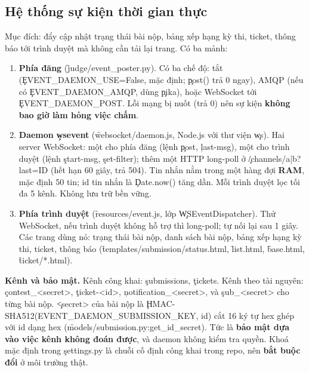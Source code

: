 \subsection{Hệ thống sự kiện thời gian thực}\label{sec:events}
Mục đích: đẩy cập nhật trạng thái bài nộp, bảng xếp hạng kỳ thi, ticket, thông báo tới trình duyệt mà không cần tải lại trang. Có ba mảnh:
\begin{enumerate}
\item \textbf{Phía đăng} (\f{judge/event_poster.py}). Có ba chế độ: tắt (\c{EVENT_DAEMON_USE=False}, mặc định; \c{post()} trả 0 ngay), AMQP (nếu có \c{EVENT_DAEMON_AMQP}, dùng \c{pika}), hoặc WebSocket tới \c{EVENT_DAEMON_POST}. Lỗi mạng bị nuốt (trả 0) nên sự kiện \textbf{không bao giờ làm hỏng việc chấm}. \tS
\item \textbf{Daemon \c{wsevent}} (\f{websocket/daemon.js}, Node.js với thư viện \c{ws}). Hai server WebSocket: một cho phía đăng (lệnh \c{post}, \c{last-msg}), một cho trình duyệt (lệnh \c{start-msg}, \c{set-filter}); thêm một HTTP long-poll ở \c{/channels/a|b?last=ID} (hết hạn 60 giây, trả 504). Tin nhắn nằm trong một hàng đợi \textbf{RAM}, mặc định 50 tin; id tin nhắn là \c{Date.now()} tăng dần. Mỗi trình duyệt lọc tối đa 5 kênh. Không lưu trữ bền vững. \tS
\item \textbf{Phía trình duyệt} (\f{resources/event.js}, lớp \c{WSEventDispatcher}). Thử WebSocket, nếu trình duyệt không hỗ trợ thì long-poll; tự nối lại sau 1 giây. Các trang dùng nó: trạng thái bài nộp, danh sách bài nộp, bảng xếp hạng kỳ thi, ticket, thông báo (\f{templates/submission/status.html}, \f{list.html}, \f{base.html}, \f{ticket/*.html}). \tS
\end{enumerate}
\textbf{Kênh và bảo mật.} Kênh công khai: \c{submissions}, \c{tickets}. Kênh theo tài nguyên: \c{contest_<secret>}, \c{ticket-<id>}, \c{notification_<secret>}, và \c{sub_<secret>} cho từng bài nộp. \c{<secret>} của bài nộp là \c{HMAC-SHA512(EVENT_DAEMON_SUBMISSION_KEY, id)} cắt 16 ký tự hex ghép với id dạng hex (\f{models/submission.py:get_id_secret}). Tức là \textbf{bảo mật dựa vào việc kênh không đoán được}, và daemon không kiểm tra quyền. Khoá mặc định trong \c{settings.py} là chuỗi cố định công khai trong repo, nên \textbf{bắt buộc đổi} ở môi trường thật. \tS


